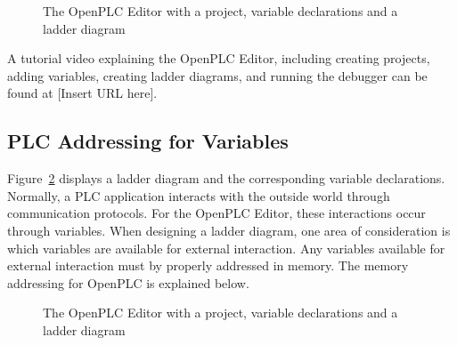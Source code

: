 \begin{figure}[!htb]
\begin{center}
\end{center}
\caption{The OpenPLC Editor with a project, variable declarations and a ladder diagram}
\label{fig:editorProject}
\end{figure}

A tutorial video explaining the OpenPLC Editor, including creating projects, adding variables, creating ladder diagrams, and running the debugger can be found at [Insert URL here].


\subsection{PLC Addressing for Variables}
Figure~\ref{fig:addressing} displays a ladder diagram and the corresponding variable declarations. Normally, a PLC application interacts with the outside world through communication protocols. For the OpenPLC Editor, these interactions occur through variables.  When designing a ladder diagram, one area of consideration is which variables are available for external interaction. Any variables available for external interaction must by properly addressed in memory. The memory addressing for OpenPLC is explained below.

\begin{figure}[!htb]
\begin{center}
\end{center}
\caption{The OpenPLC Editor with a project, variable declarations and a ladder diagram}
\label{fig:addressing}
\end{figure}

